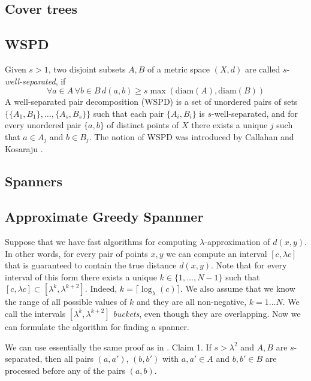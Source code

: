 \documentclass[10pt]{article}
\newcommand{\diam}{\mathrm{diam}}
\begin{document}
\subsection{Cover trees}


\subsection{WSPD}
Given $s > 1$, two disjoint subsets $A, B$ of a metric space $(X, d)$ are called $s$-\textit{well-separated},
if 
\[
\forall a \in A \, \forall b \in B \, d(a, b) \geq s \max(\diam(A), \diam(B))
\]
A well-separated pair decomposition (WSPD) is a set of unordered pairs of sets $\{ \{A_1, B_1 \}, 
\dots, \{A_s, B_s\} \}$ such that each pair $\{A_i, B_i\}$ is $s$-well-separated, and for every unordered pair $\{a, b\}$ of distinct points of $X$ there exists a unique $j$ such that $a \in A_j$ and $b \in B_j$.
The notion of WSPD was introduced by Callahan and Kosaraju \cite{cal-kos-wspd}.


\subsection{Spanners}

\subsection{Approximate Greedy Spannner}

Suppose that we have fast algorithms for computing $\lambda$-approximation of $d(x,y)$.
In other words, for every pair of points $x,y$ we can compute an interval $[c, \lambda c]$ that is guaranteed to contain 
the true distance $d(x,y)$.  Note that for every interval of this form there exists 
a unique $k \in \{1, \dots, N-1 \}$ such that $[c, \lambda c] \subset [\lambda^k, \lambda^{k+2}]$. 
Indeed, $k = \lceil \log_{\lambda}(c) \rceil$.
We also assume that we know the range of all possible values of $k$ and they are all non-negative,
$k = 1\dots N$. We call the intervals $[\lambda^k, \lambda^{k+2}]$ \textit{buckets}, even though they are overlapping.
Now we can formulate the algorithm for finding a spanner.

\begin{algorithmic}
\label{alg:local_init}
    \EndFor
\EndFunction
\end{algorithmic}

We can use essentially the same proof as in \cite{bose2010computing}.
Claim 1. If $s > \lambda^2 $ and $A, B$ are $s$-separated, then all pairs $(a, a')$, $(b, b')$ with $a, a' \in A$
and $b, b' \in B$ are processed before any of the pairs $(a, b)$.
\end{document}
